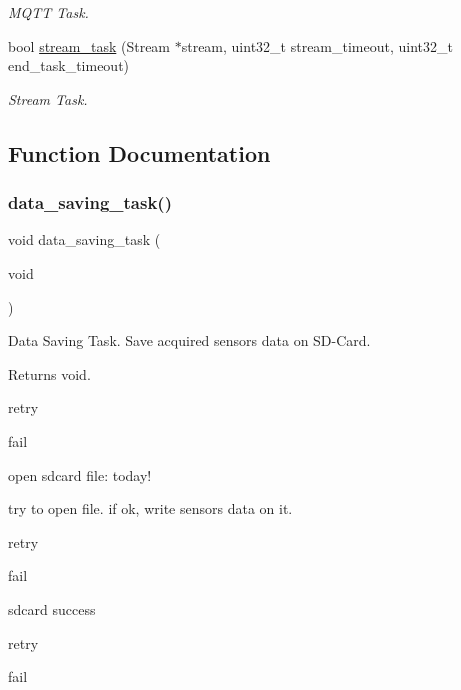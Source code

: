 \begin{DoxyCompactItemize}
\begin{DoxyCompactList}\small\item\em M\+Q\+TT Task. \end{DoxyCompactList}\item 
bool \hyperlink{rmap_8ino_a21575354e8ec54fa31f581ed1838be79}{stream\+\_\+task} (Stream $\ast$stream, uint32\+\_\+t stream\+\_\+timeout, uint32\+\_\+t end\+\_\+task\+\_\+timeout)
\begin{DoxyCompactList}\small\item\em Stream Task. \end{DoxyCompactList}\end{DoxyCompactItemize}


\subsection{Function Documentation}
\mbox{\label{rmap_8ino_a1c6cee0cbd43bbe1215f13cab2434347}} 
\subsubsection{\texorpdfstring{data\+\_\+saving\+\_\+task()}{data\_saving\_task()}}
{\footnotesize\ttfamily void data\+\_\+saving\+\_\+task (\begin{DoxyParamCaption}\item[{void}]{ }\end{DoxyParamCaption})}



Data Saving Task. Save acquired sensors data on S\+D-\/\+Card. 

\begin{DoxyReturn}{Returns}
void. 
\end{DoxyReturn}
retry

fail

open sdcard file\+: today!

try to open file. if ok, write sensors data on it.

retry

fail

sdcard success

retry

fail \mbox{\label{rmap_8ino_abac8959915b759aa6429243ab9599ee3}} 
